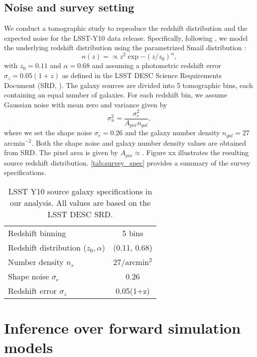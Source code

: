 \documentclass{aa}
\begin{document}
\subsection{Noise and survey setting}
We conduct a tomographic study to reproduce the redshift distribution and the expected noise for the LSST-Y10 data release.
Specifically, following \citet{zhang2022transitioning}, we model the underlying redshift distribution using the parametrized Smail distribution \citep{smail1995deep}:
\begin{equation}
    n(z)=\propto z^2 \exp{-(z/z_0)^{\alpha}},
\end{equation}
with $z_0=0.11$ and $\alpha=0.68$ and assuming a photometric redshift error $\sigma_z=0.05(1+z)$ as defined in the LSST DESC Science Requirements Document (SRD, \citet{mandelbaum2018lsst}).
The galaxy sources are divided into 5 tomographic bins, each containing an equal number of galaxies. 
For each redshift bin, we assume Gaussian noise with mean zero and variance given by
 \begin{equation}
     \sigma^2_n= \frac{\sigma_e^2}{A_{pix}n_{gal}},
 \end{equation}
where we set the shape noise $\sigma_e = 0.26$ and the galaxy number density $n_{gal}=27$ arcmin$^{-2}$. Both the shape noise and galaxy number density values are obtained from SRD. The pixel area is given by $A_{pix}\approx$. 
Figure  xx illustrates the resulting source redshift distribution. \autoref{tab:survey_spec} provides a summary of the survey specifications.
\begin{table}
	\centering
	\caption{ LSST Y10 source galaxy specifications in our analysis. All values are based on the LSST DESC SRD.}
	\begin{tabular}{lc} 
             \hline \hline
		Redshift binning & 5 bins \\
		Redshift distribution ($z_{0}, \alpha$) & (0.11, 0.68)  \\
		Number density $n_s$ & 27/arcmin$^2$ \\
		Shape noise $\sigma_e$ & 0.26 \\
		Redshift error $\sigma_z$ &0.05(1+z)  \\
		\hline
	\end{tabular}
	\label{tab:survey_spec}
\end{table}
\section{Inference over forward simulation models}
\end{document}
